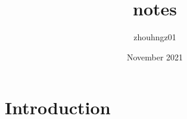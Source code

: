 \documentclass{article}
\title{notes}
\author{zhouhngz01 }
\date{November 2021}
\begin{document}
\maketitle

\section{Introduction}
\end{document}
